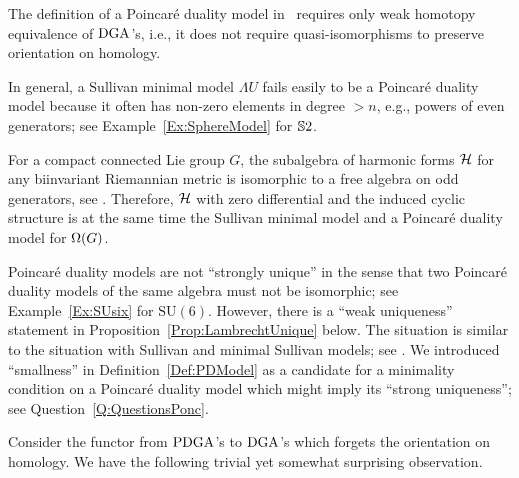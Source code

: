 \documentclass[\MainFolder/Text.tex]{subfiles}
\begin{document}
\begin{Remark}
\begin{RemarkList}
\item The definition of a Poincar\'e duality model in~\cite{Lambrechts2007} requires only weak homotopy equivalence of $\mathrm{DGA}$'s, i.e., it does not require quasi-isomorphisms to preserve orientation on homology.

\item In general, a Sullivan minimal model $\Lambda U$ fails easily to be a Poincar\'e duality model because it often has non-zero elements in degree $>n$, e.g., powers of even generators; see Example~\ref{Ex:SphereModel} for $\mathbb{S}{2}$. 

For a compact connected Lie group $G$, the subalgebra of harmonic forms $\mathcal{H}$ for any biinvariant Riemannian metric is isomorphic to a free algebra on odd generators, see \cite[Chapter~1]{Felix2008}. Therefore, $\mathcal{H}$ with zero differential and the induced cyclic structure is at the same time the Sullivan minimal model and a Poincar\'e duality model for $\Omega(G)$.

\item Poincar\'e duality models are not ``strongly unique'' in the sense that two Poincar\'e duality models of the same algebra must not be isomorphic; see Example~\ref{Ex:SUsix} for $\mathrm{SU}(6)$. However, there is a ``weak uniqueness'' statement in Proposition~\ref{Prop:LambrechtUnique} below. The situation is similar to the situation with Sullivan and minimal Sullivan models; see \cite{Felix2008}. We introduced ``smallness'' in Definition~\ref{Def:PDModel} as a candidate for a minimality condition on a Poincar\'e duality model which might imply its ``strong uniqueness''; see Question~\ref{Q:QuestionsPonc}.
\qedhere
\end{RemarkList}
\end{Remark}

Consider the functor from $\mathrm{PDGA}$'s to $\mathrm{DGA}$'s which forgets the orientation on homology. We have the following trivial yet somewhat surprising observation.
\end{document}
